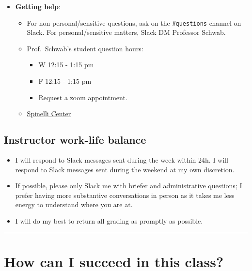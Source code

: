 \documentclass[
  letterpaper,
  DIV=11,
  numbers=noendperiod]{scrartcl}
\providecommand{\tightlist}{%
  \setlength{\itemsep}{0pt}\setlength{\parskip}{0pt}}\usepackage{longtable,booktabs,array}
\begin{document}
\begin{itemize}
\item
  \textbf{Getting help}:

  \begin{itemize}
  \item
    For non personal/sensitive questions, ask on the
    \texttt{\#questions} channel on Slack. For personal/sensitive
    matters, Slack DM Professor Schwab.
  \item
    Prof.~Schwab's student question hours:

    \begin{itemize}
    \item
      W 12:15 - 1:15 pm
    \item
      F 12:15 - 1:15 pm
    \item
      Request a zoom appointment.
    \end{itemize}
  \item
    \href{https://www.smith.edu/academics/spinelli-center/tutoring}{Spinelli
    Center}
  \end{itemize}
\end{itemize}

\hypertarget{work-life-balance}{%
\subsection{Instructor work-life balance}\label{work-life-balance}}

\begin{itemize}
\tightlist
\item
  I will respond to Slack messages sent during the week within 24h. I
  will respond to Slack messages sent during the weekend at my own
  discretion.
\item
  If possible, please only Slack me with briefer and administrative
  questions; I prefer having more substantive conversations in person as
  it takes me less energy to understand where you are at.
\item
  I will do my best to return all grading as promptly as possible.
\end{itemize}

\begin{center}\rule{0.5\linewidth}{0.5pt}\end{center}

\hypertarget{how-can-i-succeed-in-this-class}{%
\section{How can I succeed in this
class?}\label{how-can-i-succeed-in-this-class}}
\end{document}
